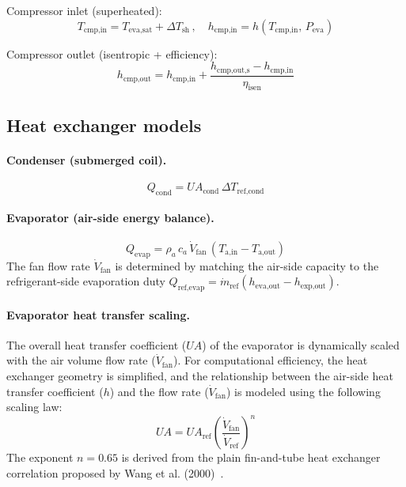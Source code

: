 Compressor inlet (superheated):
\begin{equation}\label{eq:ashp-cmp-in}
  T_\text{cmp,in} = T_\text{eva,sat} + \Delta T_\text{sh}
  \,,\quad
  h_\text{cmp,in} = h(T_\text{cmp,in},\,P_\text{eva})
\end{equation}

Compressor outlet (isentropic + efficiency):
\begin{equation}\label{eq:ashp-cmp-out}
  h_\text{cmp,out} = h_\text{cmp,in} + \frac{h_\text{cmp,out,s} - h_\text{cmp,in}}{\eta_\text{isen}}
\end{equation}

\subsection{Heat exchanger models}

\paragraph{Condenser (submerged coil).}
\begin{equation}\label{eq:ashp-Qcond}
  Q_\text{cond} = UA_\text{cond}\,\Delta T_\text{ref,cond}
\end{equation}

\paragraph{Evaporator (air-side energy balance).}
\begin{equation}\label{eq:ashp-Qevap}
  Q_\text{evap} = \rho_a\,c_a\,\dot{V}_\text{fan}\,(T_\text{a,in} - T_\text{a,out})
\end{equation}
The fan flow rate $\dot{V}_\text{fan}$ is determined by matching the air-side capacity to the refrigerant-side evaporation duty $Q_\text{ref,evap} = \dot{m}_\text{ref}(h_\text{eva,out} - h_\text{exp,out})$.

\paragraph{Evaporator heat transfer scaling.}
The overall heat transfer coefficient ($UA$) of the evaporator is dynamically scaled with the air volume flow rate ($\dot{V}_\text{fan}$). For computational efficiency, the heat exchanger geometry is simplified, and the relationship between the air-side heat transfer coefficient ($h$) and the flow rate ($\dot{V}_\text{fan}$) is modeled using the following scaling law:
\begin{equation}\label{eq:ashp-UA}
  UA = UA_\text{ref} \left( \frac{\dot{V}_\text{fan}}{\dot{V}_\text{ref}} \right)^n
\end{equation}
The exponent $n=0.65$ is derived from the plain fin-and-tube heat exchanger correlation proposed by Wang et al. (2000)~\cite{wang2000heat}. 

